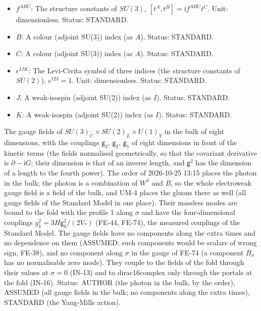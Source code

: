 \documentclass[
  10pt,
]{article}
\begin{document}
\begin{itemize}
  \(\partial\): A partial derivative: the derivative with respect to one
  variable at fixed values of the others (\(\partial_\sigma\) with
  respect to \(\sigma\); \(\partial_M\) and \(\partial_\mu\) with
  respect to the coordinate that carries the same index, of the eight
  dimensions or of the fold). Status: STANDARD.
\item
  \(f^{ABC}\): The structure constants of \(SU(3)\),
  \([t^A, t^B] = \mathrm{i}f^{ABC}t^C\). Unit: dimensionless. Status:
  STANDARD.
\item
  \(B\): A colour (adjoint SU(3)) index (as \(A\)). Status: STANDARD.
\item
  \(C\): A colour (adjoint SU(3)) index (as \(A\)). Status: STANDARD.
\item
  \(\epsilon^{IJK}\): The Levi-Civita symbol of three indices (the
  structure constants of \(SU(2)\)), \(\epsilon^{123} = 1\). Unit:
  dimensionless. Status: STANDARD.
\item
  \(J\): A weak-isospin (adjoint SU(2)) index (as \(I\)). Status:
  STANDARD.
\item
  \(K\): A weak-isospin (adjoint SU(2)) index (as \(I\)). Status:
  STANDARD.
\end{itemize}

The gauge fields of \(SU(3)_C \times SU(2)_L \times U(1)_Y\) in the bulk
of eight dimensions, with the couplings \(\mathsf{g}_3\),
\(\mathsf{g}_2\), \(\mathsf{g}_1\) of eight dimensions in front of the
kinetic terms (the fields normalised geometrically, so that the
covariant derivative is \(\partial - \mathrm{i}G\); their dimension is
that of an inverse length, and \(\mathsf{g}^2\) has the dimension of a
length to the fourth power). The order of 2026-10-25 13:15 places the
photon in the bulk; the photon is a combination of \(W^3\) and \(B\), so
the whole electroweak gauge field is a field of the bulk, and UM-4
places the gluons there as well (all gauge fields of the Standard Model
in one place). Their massless modes are bound to the fold with the
profile 1 along \(\sigma\) and have the four-dimensional couplings
\(g_k^2 = 3H\mathsf{g}_k^2/(2V_*)\) (FE-44, FE-74), the measured
couplings of the Standard Model. The gauge fields have no components
along the extra times and no dependence on them (ASSUMED: such
components would be scalars of wrong sign, FE-38), and no component
along \(\sigma\) in the gauge of FE-74 (a component \(B_\sigma\) has no
normalisable zero mode). They couple to the fields of the fold through
their values at \(\sigma = 0\) (IN-13) and to dirac16complex only
through the portals at the fold (IN-16). Status: AUTHOR (the photon in
the bulk, by the order), ASSUMED (all gauge fields in the bulk; no
components along the extra times), STANDARD (the Yang-Mills action).
\end{document}

